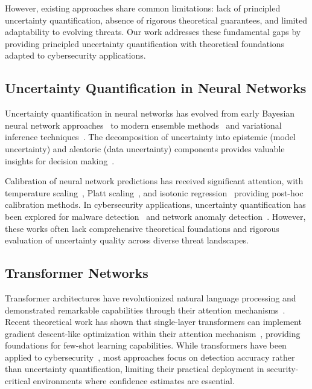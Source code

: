 \documentclass[journal]{IEEEtran}
\begin{document}
However, existing approaches share common limitations: lack of principled uncertainty quantification, absence of rigorous theoretical guarantees, and limited adaptability to evolving threats. Our work addresses these fundamental gaps by providing principled uncertainty quantification with theoretical foundations adapted to cybersecurity applications.

\subsection{Uncertainty Quantification in Neural Networks}

Uncertainty quantification in neural networks has evolved from early Bayesian neural network approaches~\cite{mackay1992practical} to modern ensemble methods~\cite{lakshminarayanan2017simple} and variational inference techniques~\cite{blundell2015weight}. The decomposition of uncertainty into epistemic (model uncertainty) and aleatoric (data uncertainty) components provides valuable insights for decision making~\cite{kendall2017uncertainties}.

Calibration of neural network predictions has received significant attention, with temperature scaling~\cite{guo2017calibration}, Platt scaling~\cite{platt1999probabilistic}, and isotonic regression~\cite{zadrozny2002transforming} providing post-hoc calibration methods. In cybersecurity applications, uncertainty quantification has been explored for malware detection~\cite{grosse2017statistical} and network anomaly detection~\cite{wang2019uncertainty}. However, these works often lack comprehensive theoretical foundations and rigorous evaluation of uncertainty quality across diverse threat landscapes.

\subsection{Transformer Networks}

Transformer architectures have revolutionized natural language processing and demonstrated remarkable capabilities through their attention mechanisms~\cite{vaswani2017attention}. Recent theoretical work has shown that single-layer transformers can implement gradient descent-like optimization within their attention mechanism~\cite{akyurek2022learning}, providing foundations for few-shot learning capabilities. While transformers have been applied to cybersecurity~\cite{tian2021tranad}, most approaches focus on detection accuracy rather than uncertainty quantification, limiting their practical deployment in security-critical environments where confidence estimates are essential.
\end{document}
